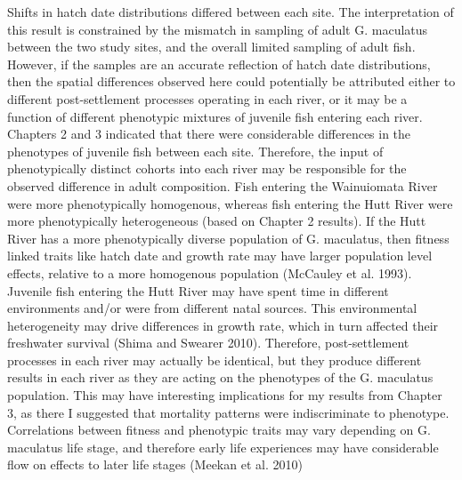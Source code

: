 \documentclass[]{book}
\begin{document}
Shifts in hatch date distributions differed between each site. The
interpretation of this result is constrained by the mismatch in sampling
of adult G. maculatus between the two study sites, and the overall
limited sampling of adult fish. However, if the samples are an accurate
reflection of hatch date distributions, then the spatial differences
observed here could potentially be attributed either to different
post-settlement processes operating in each river, or it may be a
function of different phenotypic mixtures of juvenile fish entering each
river. Chapters 2 and 3 indicated that there were considerable
differences in the phenotypes of juvenile fish between each site.
Therefore, the input of phenotypically distinct cohorts into each river
may be responsible for the observed difference in adult composition.
Fish entering the Wainuiomata River were more phenotypically homogenous,
whereas fish entering the Hutt River were more phenotypically
heterogeneous (based on Chapter 2 results). If the Hutt River has a more
phenotypically diverse population of G. maculatus, then fitness linked
traits like hatch date and growth rate may have larger population level
effects, relative to a more homogenous population (McCauley et al.
1993). Juvenile fish entering the Hutt River may have spent time in
different environments and/or were from different natal sources. This
environmental heterogeneity may drive differences in growth rate, which
in turn affected their freshwater survival (Shima and Swearer 2010).
Therefore, post-settlement processes in each river may actually be
identical, but they produce different results in each river as they are
acting on the phenotypes of the G. maculatus population. This may have
interesting implications for my results from Chapter 3, as there I
suggested that mortality patterns were indiscriminate to phenotype.
Correlations between fitness and phenotypic traits may vary depending on
G. maculatus life stage, and therefore early life experiences may have
considerable flow on effects to later life stages (Meekan et al. 2010)
\end{document}
